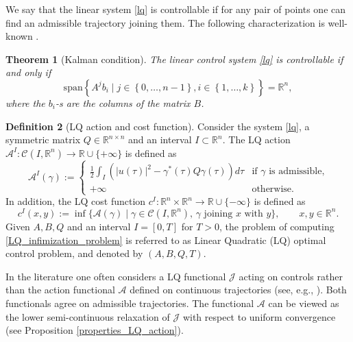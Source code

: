 \documentclass[reqno]{amsart}
\theoremstyle{plain}
\newtheorem{thm}{Theorem}[section]
\theoremstyle{definition}
\newtheorem{Def}[thm]{Definition}
\theoremstyle{remark}
\begin{document}
We say that the linear system \eqref{lq} is controllable if for any pair of points one can find an admissible trajectory joining them. The following characterization is well-known \cite{coron2007control,agrachev2013control}.
\begin{thm}[Kalman condition]\label{thm:kalman}
        The linear control system \eqref{lq} is controllable if and only if 
		\begin{equation}\label{Kalman}
			\mathrm{span}\left\{A^jb_i\mid j\in\left\{0,\dots,n-1\right\},i\in\left\{1,\dots,k\right\}\right\}=\mathbb{R}^n,
		\end{equation}
		where the $b_i$-s are the columns of the matrix $B$.
\end{thm}
\begin{Def}[LQ action and cost function]\label{cost}
            Consider the system \eqref{lq}, a symmetric matrix $Q\in\mathbb{R}^{n \times n}$ and an interval $I\subset\mathbb{R}^n$. The LQ action $\mathcal{A}^{I}:\mathcal{C}\left(I,\mathbb{R}^n\right)\to\mathbb{R}\cup\{+\infty\}$ is defined as 
            \begin{equation}
		\mathcal{A}^{I}(\gamma) :=
		\begin{cases}
			\displaystyle\frac{1}{2}\int_I\left(|u(\tau)|^2-\gamma^*(\tau)Q\gamma(\tau)\right)d\tau & \text{if $\gamma$ is admissible,} \\
			+\infty & \text{otherwise.}
		\end{cases}
		\end{equation}
        In addition, the LQ cost function $c^{I}:\mathbb{R}^n\times\mathbb{R}^n\to\mathbb{R}\cup\{-\infty\}$ is defined as
        \begin{equation}\label{LQ_infimization_problem}
			c^{I}(x,y):=\inf\{\mathcal{A}(\gamma)\mid \gamma\in \mathcal{C}\left(I,\mathbb{R}^n\right),\, \text{$\gamma$ joining $x$ with $y$}\},\qquad x,y\in\mathbb{R}^n.	
		\end{equation}
        Given $A,B,Q$ and an interval $I=[0,T]$ for $T>0$, the problem of computing \eqref{LQ_infimization_problem} is referred to as Linear Quadratic (LQ) optimal control problem, and denoted by $(A,B,Q,T)$.
	\end{Def}
        
        In the literature one often considers a LQ functional $\mathcal{J}$ acting on controls rather than the action functional $\mathcal{A}$ defined on continuous trajectories (see, e.g., \cite[Chapter 16]{agrachev2013control}). Both functionals agree on admissible trajectories. The functional $\mathcal{A}$ can be viewed as the lower semi-continuous relaxation of $\mathcal{J}$ with respect to uniform convergence (see Proposition \ref{properties_LQ_action}).
        
\end{document}
